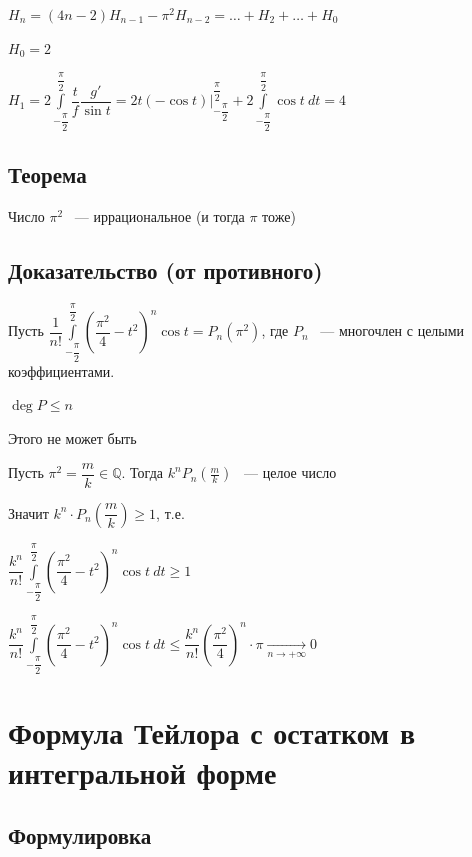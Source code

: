 \documentclass{article}
\begin{document}
			$H_n = (4n - 2) H_{n - 1} - \pi^2 H_{n - 2} = \ldots + H_2 + \ldots + H_0$
			
			$H_0 = 2$
			
			$H_1 = 2 \int\limits^{\dfrac{\pi}{2}}_{-\dfrac{\pi}{2}} \dfrac{t}{f} \dfrac{g'}{\sin t} = 2t (- \cos t)\bigg|^{\dfrac{\pi}{2}}_{-\dfrac{\pi}{2}} + 2 \int\limits^{\dfrac{\pi}{2}}_{-\dfrac{\pi}{2}} \cos t \ dt = 4$
			
		\subsection{Теорема}
		
			Число $\pi^2$ ~--- иррациональное (и тогда $\pi$ тоже)
			
		\subsection{Доказательство (от противного)}
		
			Пусть $\dfrac{1}{n!} \int\limits^{\dfrac{\pi}{2}}_{-\dfrac{\pi}{2}} \left(\dfrac{\pi^2}{4} - t^2\right)^n \cos t = P_n (\pi^2)$, где $P_n$ ~--- многочлен с целыми коэффициентами.
			
			$\deg P \leq n$
			
			Этого не может быть
			
			Пусть $\pi^2 = \dfrac{m}{k} \in \mathbb{Q}$. Тогда $k^n P_n\left(\frac{m}{k}\right)$ ~--- целое число
			
			Значит $k^n \cdot P_n \left(\dfrac{m}{k}\right) \geq 1$, т.е.
			
			$\dfrac{k^n}{n!} \int\limits^{\dfrac{\pi}{2}}_{-\dfrac{\pi}{2}} \left(\dfrac{\pi^2}{4} - t^2\right)^n \cos t \ dt \geq 1$
			
			$\dfrac{k^n}{n!} \int\limits^{\dfrac{\pi}{2}}_{-\dfrac{\pi}{2}} \left(\dfrac{\pi^2}{4} - t^2\right)^n \cos t \ dt \leq \dfrac{k^n}{n!} \left(\dfrac{\pi^2}{4}\right)^n \cdot \pi \xrightarrow[n \rightarrow +\infty]{} 0$
			
	\newpage
	
	\newpage

	\section{Формула Тейлора с остатком в интегральной форме}


		\subsection{Формулировка}
\end{document}
